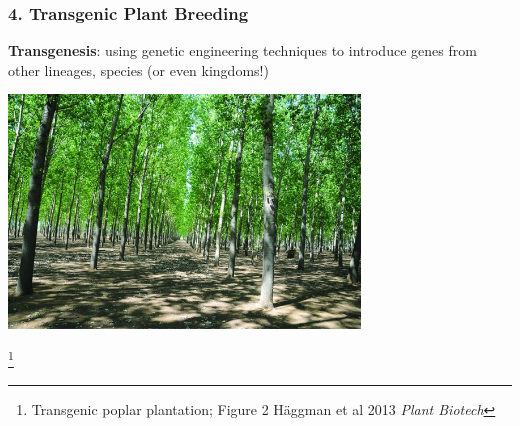 \documentclass[xcolor=dvipsnames]{beamer}
\newcommand\blfootnote[1]{%
	\begingroup
	\renewcommand\thefootnote{}\footnote{#1}%
	\addtocounter{footnote}{-1}%
	\endgroup
}
\begin{document}
\begin{frame}
	\frametitle{4. Transgenic Plant Breeding }
	\textbf{Transgenesis}: using genetic engineering techniques to introduce genes from other lineages, species (or even kingdoms!)\\
	\vspace{20pt}
	
		\centering	\includegraphics[keepaspectratio, width  = 0.7\textwidth]{img/transgenicPoplar}
	
\blfootnote{Transgenic poplar plantation; Figure 2  Häggman et al 2013 \textit{Plant Biotech}}

	


\end{frame}
\end{document}
